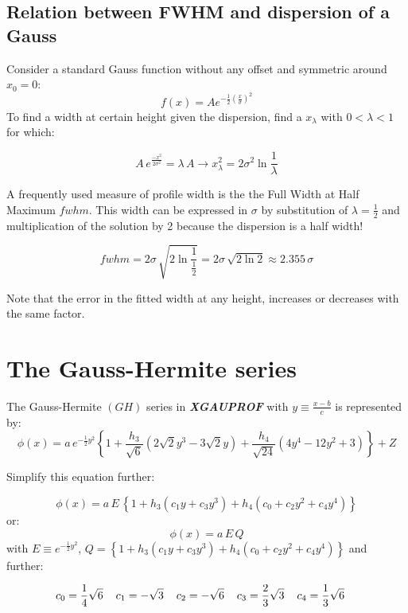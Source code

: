 \documentclass[10pt,a4paper]{report}
\begin{document}
\begin{flushleft}
\section{Relation between FWHM and dispersion of a Gauss}

Consider a standard Gauss function without any offset and symmetric around
$x_0 = 0$:
$$f(x) = A{e^{-\frac{1}{2} {(\frac{x}{\sigma})}^2}} $$
To find a width at certain height given the dispersion, 
find a $x_\lambda$ with $0< \lambda < 1$ for which:
 
$$A\,e^{\frac{-x^2}{2\sigma^2}} = \lambda\,A   \longrightarrow
x^2_\lambda = 2 \sigma^2 \ln{\frac{1}{\lambda}}$$

\begin{center}
\end{center}

A frequently used measure of profile width is the the Full Width at Half Maximum 
$fwhm$. This width can be expressed in $\sigma$ by substitution of
$\lambda = {\frac {1}{2}}$ and multiplication of the solution by 2
because the dispersion is a half width!

\begin{center}

$$fwhm = 2 \sigma\, \sqrt{2 \ln{ \frac{1}{\frac{1}{2}} } }
= 2 \sigma\, \sqrt{2\ln{2}} \approx 2.355\, \sigma  $$


\end{center} 
Note that the error in the fitted width at any height, increases or decreases with the same factor.


\chapter{The Gauss-Hermite series}

The Gauss-Hermite $(GH)$ series in {\bf \it XGAUPROF} with 
$y \equiv \frac{x-b}{c}$ is represented by:
$$
\phi(x) = a\,e^{-\frac{1}{2}y^2} \left\{ 1+\frac{h_3}{\sqrt{6}}
(2\sqrt{2}y^3-3\sqrt{2}y) + 
\frac{h_4}{\sqrt{24}}(4y^4-12y^2+3)   \right\} + Z
$$

Simplify this equation further:

$$\phi(x) = a\,E\,\left\{1+h_3(c_1y+c_3y^3)+h_4(c_0+c_2y^2+c_4y^4)\right\}$$
or:
$$\phi(x) =  a\,E\,Q$$
with  $E \equiv e^{-\frac{1}{2}y^2}$,
$Q = \left\{1+h_3(c_1y+c_3y^3)+h_4(c_0+c_2y^2+c_4y^4)\right\}$ and further:

$$c_0 = \frac{1}{4}\sqrt{6}\hspace{0.4cm}
c_1 = -\sqrt{3}\hspace{0.4cm}
c_2 = -\sqrt{6}\hspace{0.4cm}
c_3 = \frac{2}{3}\sqrt{3}\hspace{0.4cm}
c_4 = \frac{1}{3}\sqrt{6}\hspace{0.4cm}
$$


\end{flushleft}
\end{document}
